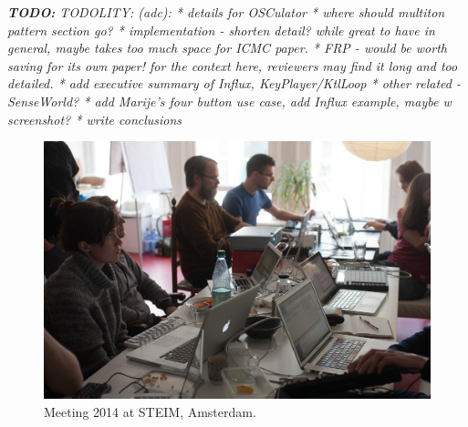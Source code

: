 \documentclass{article}
\title{\papertitle}
\newcommand{\todo}[1] {\emph{\textbf{TODO:} #1}}
\begin{document}
%
\capstartfalse
\maketitle
\capstarttrue
%
\todo{ {TODOLITY:} (adc):
* details for OSCulator
* where should multiton pattern section go?
* implementation - shorten detail? while great to have in general, maybe takes too much space for ICMC paper.
* FRP - would be worth saving for its own paper! for the context here, reviewers may find it long and too detailed.
* add executive summary of Influx, KeyPlayer/KtlLoop
* other related - SenseWorld? 
* add Marije's four button use case, add Influx example, maybe w screenshot?
* write conclusions
}

\begin{abstract}

The Modality Project explores the idea of highly modal performance instruments; i.e. instrument setups in which a small set of controllers can be used to play a wide variety of sound processes by changing control constellations on the fly, in performance. 
The Modality Toolkit is a SuperCollider library which simplifies the creation of individual electronic instruments by combining custom sound engines with off-the-shelf controllers in  simple-to-write, flexible configurations.

This paper gives an overview on the concept of modality as seen by a group of sound artists and researchers, and describes one interdisciplinary approach to creating a toolkit written for and by electronic musicians.

\end{abstract}

\begin{figure}[h]
	\centering
		\includegraphics[width=.9\columnwidth]{../media/20140331-IMG_5976.jpg}
	\caption{Meeting 2014 at STEIM, Amsterdam.}
	\label{fig:media_20140331-IMG_5976}
\end{figure}
\end{document}
